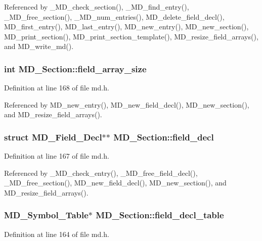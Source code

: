 Referenced by \_\-MD\_\-check\_\-section(), \_\-MD\_\-find\_\-entry(), \_\-MD\_\-free\_\-section(), \_\-MD\_\-num\_\-entries(), MD\_\-delete\_\-field\_\-decl(), MD\_\-first\_\-entry(), MD\_\-last\_\-entry(), MD\_\-new\_\-entry(), MD\_\-new\_\-section(), MD\_\-print\_\-section(), MD\_\-print\_\-section\_\-template(), MD\_\-resize\_\-field\_\-arrays(), and MD\_\-write\_\-md().
\subsubsection{\setlength{\rightskip}{0pt plus 5cm}int \bf{MD\_\-Section::field\_\-array\_\-size}}\label{structMD__Section_25b94f65830b13f4036675b61939c5cf}




Definition at line 168 of file md.h.

Referenced by MD\_\-new\_\-entry(), MD\_\-new\_\-field\_\-decl(), MD\_\-new\_\-section(), and MD\_\-resize\_\-field\_\-arrays().
\subsubsection{\setlength{\rightskip}{0pt plus 5cm}struct \bf{MD\_\-Field\_\-Decl}$\ast$$\ast$ \bf{MD\_\-Section::field\_\-decl}}\label{structMD__Section_b67ee0eac75fcbcafdb423b01357b29c}




Definition at line 167 of file md.h.

Referenced by \_\-MD\_\-check\_\-entry(), \_\-MD\_\-free\_\-field\_\-decl(), \_\-MD\_\-free\_\-section(), MD\_\-new\_\-field\_\-decl(), MD\_\-new\_\-section(), and MD\_\-resize\_\-field\_\-arrays().
\subsubsection{\setlength{\rightskip}{0pt plus 5cm}\bf{MD\_\-Symbol\_\-Table}$\ast$ \bf{MD\_\-Section::field\_\-decl\_\-table}}\label{structMD__Section_678e680e4c28c77098d6117508f3f714}




Definition at line 164 of file md.h.

